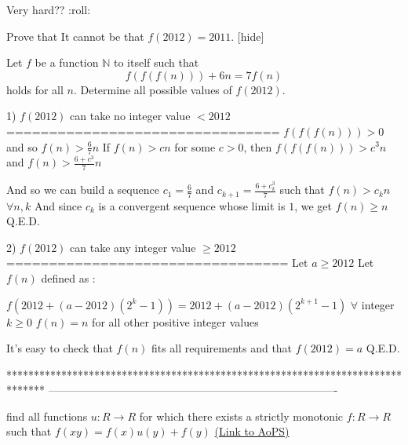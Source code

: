 \begin{solution}
	Very hard??  :roll:
\end{solution}



\begin{solution}
Prove that It cannot be that $f(2012)=2011$.
[\/hide]
\end{solution}



\begin{solution}
	\begin{tcolorbox}Let $f$ be a function $\mathbb{N}$ to itself such that 
\[f(f(f(n)))+6n=7f(n)\]
holds for all $n$. Determine all possible values of $f(2012)$.\end{tcolorbox}
1) $f(2012)$ can take no integer value $<2012$
================================
$f(f(f(n)))>0$ and so $f(n)>\frac 67 n$
If $f(n)>cn$ for some $c>0$, then $f(f(f(n)))>c^3n$ and $f(n)>\frac{6+c^3}7n$

And so we can build a sequence $c_1=\frac 67$ and $c_{k+1}=\frac{6+c_k^3}7$ such that $f(n)>c_kn$ $\forall n,k$
And since $c_k$ is a convergent sequence whose limit is $1$, we get $f(n)\ge n$
Q.E.D.

2) $f(2012)$ can take any integer value $\ge 2012$
=================================
Let $a\ge 2012$
Let $f(n)$ defined as :

$f(2012+(a-2012)(2^k-1))=2012+(a-2012)(2^{k+1}-1)$ $\forall$ integer $k\ge 0$
$f(n)=n$ for all other positive integer values

It's easy to check that $f(n)$ fits all requirements and that $f(2012)=a$
Q.E.D.
\end{solution}
*******************************************************************************
-------------------------------------------------------------------------------

\begin{problem}
	find all functions $u:R\to R$ for which there exists a strictly monotonic $f:R\to R$ such that $f(xy)=f(x)u(y)+f(y)$
	\flushright \href{https://artofproblemsolving.com/community/c6h466126}{(Link to AoPS)}
\end{problem}




